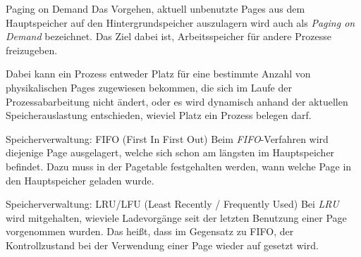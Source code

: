 \begin{bonus}{Paging on Demand}
    Das Vorgehen, aktuell
    unbenutzte Pages aus dem Hauptspeicher auf den Hintergrundspeicher auszulagern
    wird auch als \emph{Paging on Demand} bezeichnet.
    Das Ziel dabei ist, Arbeitsspeicher
    für andere Prozesse freizugeben.

    Dabei kann ein Prozess entweder Platz für eine
    bestimmte Anzahl von physikalischen Pages zugewiesen bekommen, die sich im
    Laufe der Prozessabarbeitung nicht ändert, oder es wird dynamisch anhand der aktuellen
    Speicherauslastung entschieden, wieviel Platz ein Prozess belegen darf.
\end{bonus}

\begin{algo}{Speicherverwaltung: FIFO (First In First Out)}
    Beim \emph{FIFO}-Verfahren wird
    diejenige Page ausgelagert, welche sich schon am längsten im Hauptspeicher
    befindet. Dazu muss in der Pagetable festgehalten werden, wann welche
    Page in den Hauptspeicher geladen wurde.
\end{algo}

\begin{algo}{Speicherverwaltung: LRU/LFU (Least Recently / Frequently Used)}
    Bei \emph{LRU}
    wird mitgehalten, wieviele Ladevorgänge seit der letzten Benutzung einer
    Page vorgenommen wurden. Das heißt, dass im Gegensatz zu FIFO, der
    Kontrollzustand bei der Verwendung einer Page wieder auf \grqq gesetzt wird.
\end{algo}

